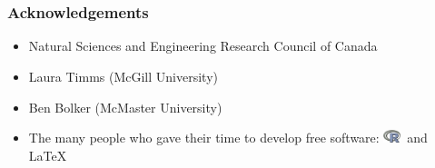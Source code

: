 \documentclass{beamer}
\numberwithin{exercise}{section}
\newcommand{\R}{\includegraphics[width=0.5cm]{Rlogo}}
\begin{document}

\section{}

\begin{frame}
\begin{center}
\frametitle{Acknowledgements}
\begin{itemize}
\item Natural Sciences and Engineering Research Council of Canada
\item Laura Timms (McGill University)
\item Ben Bolker (McMaster University)
\item The many people who gave their time to develop free software: \R\ and \LaTeX\
\end{itemize}
\end{center}
\end{frame}
\end{document}
